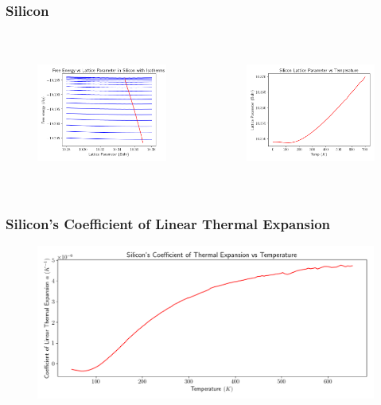 \documentclass{beamer}
\begin{document}
\begin{frame}
	\frametitle{Silicon}
	\begin{columns}
	\begin{figure}[ht]
	\begin{center}
	\includegraphics[height=1.8in]{silicon_isotherms.png}
	\end{center}
	\end{figure}
	\begin{figure}[ht]
	\begin{center}
	\includegraphics[height=1.8in]{silicon_min_volume.png}
	\end{center}
	\end{figure}
\end{columns}
\end{frame}

\begin{frame}
	\frametitle{Silicon's Coefficient of Linear Thermal Expansion}
	\begin{figure}[ht]
	\begin{center}
		\includegraphics[height=2in]{silicon_thermal_expansion.png}
	\end{center}
	\end{figure}
\end{frame}
\end{document}
